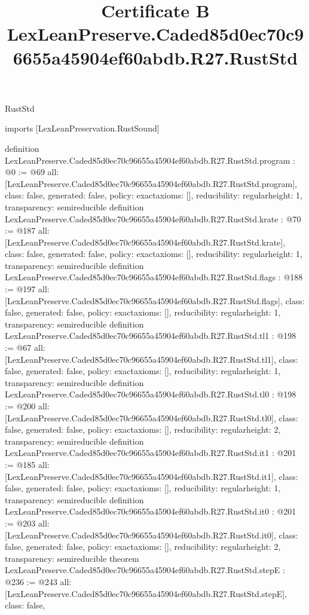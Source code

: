 \begin{lexlean}{RustStd}
\title{Certificate B LexLeanPreserve.Caded85d0ec70c96655a45904ef60abdb.R27.RustStd}
\begin{coremodule}
imports [LexLeanPreservation.RustSound]

definition LexLeanPreserve.Caded85d0ec70c96655a45904ef60abdb.R27.RustStd.program : @0 := @69 {
  all: [LexLeanPreserve.Caded85d0ec70c96655a45904ef60abdb.R27.RustStd.program],
  class: false,
  generated: false,
  policy: exact{axioms: []},
  reducibility: regular{height: 1},
  transparency: semireducible
}
definition LexLeanPreserve.Caded85d0ec70c96655a45904ef60abdb.R27.RustStd.krate : @70 := @187 {
  all: [LexLeanPreserve.Caded85d0ec70c96655a45904ef60abdb.R27.RustStd.krate],
  class: false,
  generated: false,
  policy: exact{axioms: []},
  reducibility: regular{height: 1},
  transparency: semireducible
}
definition LexLeanPreserve.Caded85d0ec70c96655a45904ef60abdb.R27.RustStd.flags : @188 := @197 {
  all: [LexLeanPreserve.Caded85d0ec70c96655a45904ef60abdb.R27.RustStd.flags],
  class: false,
  generated: false,
  policy: exact{axioms: []},
  reducibility: regular{height: 1},
  transparency: semireducible
}
definition LexLeanPreserve.Caded85d0ec70c96655a45904ef60abdb.R27.RustStd.tl1 : @198 := @67 {
  all: [LexLeanPreserve.Caded85d0ec70c96655a45904ef60abdb.R27.RustStd.tl1],
  class: false,
  generated: false,
  policy: exact{axioms: []},
  reducibility: regular{height: 1},
  transparency: semireducible
}
definition LexLeanPreserve.Caded85d0ec70c96655a45904ef60abdb.R27.RustStd.tl0 : @198 := @200 {
  all: [LexLeanPreserve.Caded85d0ec70c96655a45904ef60abdb.R27.RustStd.tl0],
  class: false,
  generated: false,
  policy: exact{axioms: []},
  reducibility: regular{height: 2},
  transparency: semireducible
}
definition LexLeanPreserve.Caded85d0ec70c96655a45904ef60abdb.R27.RustStd.it1 : @201 := @185 {
  all: [LexLeanPreserve.Caded85d0ec70c96655a45904ef60abdb.R27.RustStd.it1],
  class: false,
  generated: false,
  policy: exact{axioms: []},
  reducibility: regular{height: 1},
  transparency: semireducible
}
definition LexLeanPreserve.Caded85d0ec70c96655a45904ef60abdb.R27.RustStd.it0 : @201 := @203 {
  all: [LexLeanPreserve.Caded85d0ec70c96655a45904ef60abdb.R27.RustStd.it0],
  class: false,
  generated: false,
  policy: exact{axioms: []},
  reducibility: regular{height: 2},
  transparency: semireducible
}
theorem LexLeanPreserve.Caded85d0ec70c96655a45904ef60abdb.R27.RustStd.stepE : @236 := @243 {
  all: [LexLeanPreserve.Caded85d0ec70c96655a45904ef60abdb.R27.RustStd.stepE],
  class: false,
}
\end{coremodule}
\end{lexlean}
